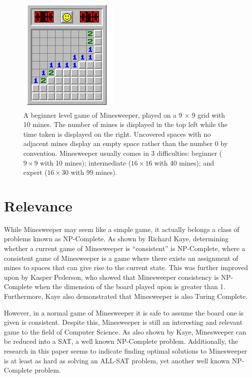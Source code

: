 \documentclass[letterpaper]{article}
\begin{document}
\begin{figure}[t]
\centering
\includegraphics[width=0.5\columnwidth]{beginner}
\caption{A beginner level game of Minesweeper, played on a 9 $\times$ 9 grid with 10 mines.  The number of mines is displayed in the top left while the time taken is displayed on the right.  Uncovered spaces with no adjacent mines display an empty space rather than the number 0 by convention.  Minesweeper usually comes in 3 difficulties: beginner ($9 \times 9$ with 10 mines); intermediate ($16 \times 16$ with 40 mines); and expert ($16 \times 30$ with 99 mines).}
\label{fig:beginner_level}
\end{figure}

\section{Relevance}
While Minesweeper may seem like a simple game, it actually belongs a class of problems known as NP-Complete.  As shown by Richard Kaye, determining whether a current game of Minesweeper is ``consistent'' is NP-Complete, where a consistent game of Minesweeper is a game where there exists an assignment of mines to spaces that can give rise to the current state.  This was further improved upon by Kasper Pederson, who showed that Minesweeper consistency is NP-Complete when the dimension of the board played upon is greater than 1.  Furthermore, Kaye also demonstrated that Minesweeper is also Turing Complete.

However, in a normal game of Minesweeper it is safe to assume the board one is given is consistent.  Despite this, Minesweeper is still an interesting and relevant game to the field of Computer Science.  As also shown by Kaye, Minesweeper can be reduced into a SAT, a well known NP-Complete problem.  Additionally, the research in this paper seems to indicate finding optimal solutions to Minesweeper is at least as hard as solving an ALL-SAT problem, yet another well known NP-Complete problem.
\end{document}
